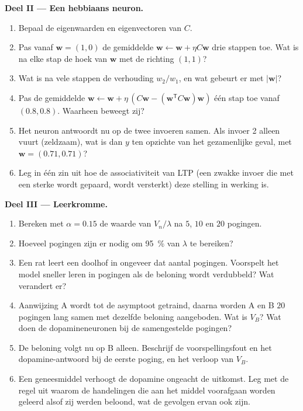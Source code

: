 \begin{problem}
\medskip
\noindent\textbf{Deel II --- Een hebbiaans neuron.}
\begin{enumerate}[resume]
  \item Bepaal de eigenwaarden en eigenvectoren van $C$.
  \item Pas vanaf $\mathbf{w} = (1, 0)$ de gemiddelde 
        $\mathbf{w} \leftarrow \mathbf{w} + \eta C\mathbf{w}$ drie
        stappen toe. Wat is na elke stap de hoek van $\mathbf{w}$ met
        de richting $(1,1)$?
  \item Wat is na vele stappen de verhouding $w_{2}/w_{1}$, en wat
        gebeurt er met $|\mathbf{w}|$?
  \item Pas de gemiddelde  $\mathbf{w} \leftarrow \mathbf{w} +
        \eta\,(C\mathbf{w} - (\mathbf{w}^{\mathsf{T}}C\mathbf{w})
        \mathbf{w})$ één stap toe vanaf $(0.8, 0.8)$. Waarheen beweegt
        zij?
  \item Het neuron antwoordt nu op de twee invoeren samen. Als invoer 2
        alleen vuurt (zeldzaam), wat is dan $y$ ten opzichte van het
        gezamenlijke geval, met $\mathbf{w} = (0.71, 0.71)$?
  \item Leg in één zin uit hoe de associativiteit van LTP (een zwakke
        invoer die met een sterke wordt gepaard, wordt versterkt) deze
        stelling in werking is.
\end{enumerate}

\medskip
\noindent\textbf{Deel III --- Leerkromme.}
\begin{enumerate}[resume]
  \item Bereken met $\alpha = 0.15$ de waarde van $V_{n}/\lambda$ na
        $5$, $10$ en $20$ pogingen.
  \item Hoeveel pogingen zijn er nodig om \qty{95}{\%} van $\lambda$ te bereiken?
  \item Een rat leert een doolhof in ongeveer dat aantal pogingen.
        Voorspelt het model sneller leren in pogingen als de beloning
        wordt verdubbeld? Wat verandert er?
  \item Aanwijzing A wordt tot de asymptoot getraind, daarna worden A
        en B $20$ pogingen lang samen met dezelfde beloning aangeboden.
        Wat is $V_{B}$? Wat doen de dopamineneuronen bij de
        samengestelde pogingen?
  \item De beloning volgt nu op B alleen. Beschrijf de
        voorspellingsfout en het dopamine-antwoord bij de eerste
        poging, en het verloop van $V_{B}$.
  \item Een geneesmiddel verhoogt de dopamine ongeacht de uitkomst. Leg
        met de regel uit waarom de handelingen die aan het middel
        voorafgaan worden geleerd alsof zij werden beloond, wat de
        gevolgen ervan ook zijn.
\end{enumerate}


\end{problem}
